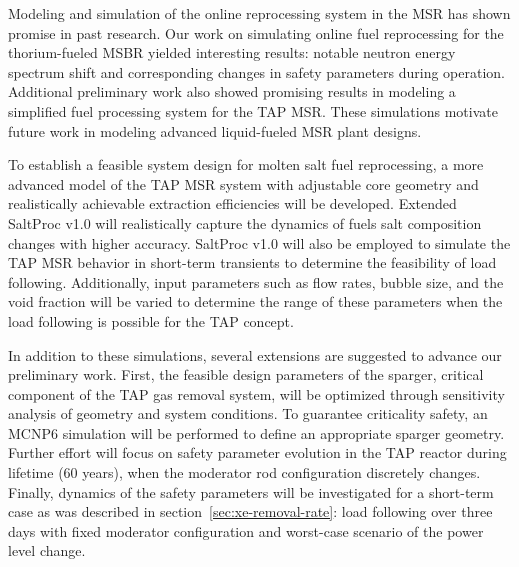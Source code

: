 Modeling and simulation of the online reprocessing system in the \gls{MSR} 
has shown promise in past research. Our work on simulating online fuel  
reprocessing for the thorium-fueled \gls{MSBR} yielded interesting results: 
notable neutron energy spectrum shift and corresponding changes in safety 
parameters during operation. Additional preliminary work also showed promising
results in modeling a simplified fuel processing system for the \gls{TAP} 
\gls{MSR}. These simulations motivate future work in modeling advanced 
liquid-fueled \gls{MSR} plant designs.

To establish a feasible system design for molten salt fuel reprocessing, a 
more advanced model of the \gls{TAP} \gls{MSR} system with adjustable core 
geometry and realistically achievable extraction efficiencies will be 
developed. Extended SaltProc v1.0 will realistically capture the dynamics of 
fuels salt composition changes with higher accuracy. SaltProc v1.0 will also 
be employed to simulate the \gls{TAP} \gls{MSR} behavior in short-term 
transients to determine the feasibility of load following. Additionally, input 
parameters such as flow rates, bubble size, and the void fraction will be 
varied to determine the range of these parameters when the load following is 
possible for the \gls{TAP} concept.

In addition to these simulations, several extensions are suggested to 
advance our preliminary work. First, the feasible design parameters of the 
sparger, critical component of the \gls{TAP} gas removal system, will be 
optimized through sensitivity analysis of geometry and system conditions. To 
guarantee criticality safety, an MCNP6 simulation will be performed to define 
an appropriate sparger geometry. Further effort will focus on safety  
parameter evolution in the \gls{TAP} reactor during lifetime (60 years),  
when the moderator rod configuration discretely changes. Finally, dynamics of 
the safety parameters will be investigated for a short-term case as was 
described in section~\ref{sec:xe-removal-rate}: load following over three days 
with fixed moderator configuration and worst-case scenario of the power level 
change. 


